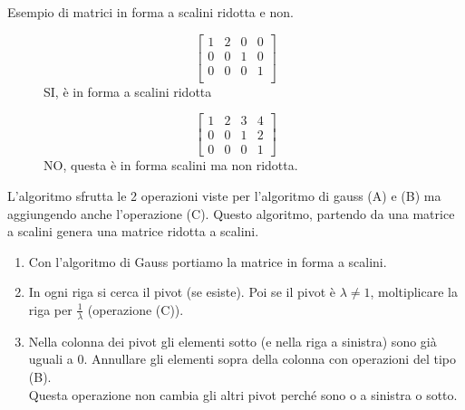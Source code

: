 \begin{example}
Esempio di matrici in forma a scalini ridotta e non.
\vspace{-10pt}
\begin{figure}[h!]
    \centering
    \begin{minipage}{.4\linewidth}
        \centering
        \[
            \begin{bmatrix}
            1 & 2 & 0 & 0\\
            0 & 0 & 1 & 0\\
            0 & 0 & 0 & 1\\
            \end{bmatrix}
        \]
        SI, è in forma a scalini ridotta
    \end{minipage}
    \hspace{.3cm}
    \begin{minipage}{.4\linewidth}
        \centering
        \[
            \begin{bmatrix}
            1 & 2 & 3 & 4\\
            0 & 0 & 1 & 2\\
            0 & 0 & 0 & 1
            \end{bmatrix}
        \]
        NO, questa è in forma scalini ma non ridotta.
    \end{minipage}
\end{figure}
\end{example}
\newpage
\begin{definition}
L'algoritmo sfrutta le 2 operazioni viste per l'algoritmo di gauss (A) e (B) ma aggiungendo anche l'operazione (C). Questo algoritmo, partendo da una matrice a scalini genera una matrice ridotta a scalini.
\begin{enumerate}
    \item Con l'algoritmo di Gauss portiamo la matrice in forma a scalini.
    \item In ogni riga si cerca il pivot (se esiste). Poi se il pivot è $\lambda \neq 1$, moltiplicare la riga per $\frac{1}{\lambda}$ (operazione (C)).
    \item Nella colonna dei pivot gli elementi sotto (e nella riga a sinistra) sono già uguali a 0. Annullare gli elementi sopra della colonna con operazioni del tipo (B).\\
    Questa operazione non cambia gli altri pivot perché sono o a sinistra o sotto.
\end{enumerate}
\end{definition}

